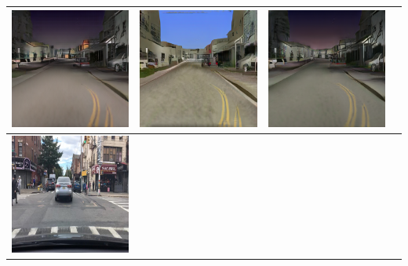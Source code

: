 \documentclass{VUMIFPSkursinis}
\begin{document}
\begin{table}[H]
{\begin{tabular}{|c|c|c|c|}
                \includegraphics[scale=0.35]{img/pvz/3_cycle_v2} & \includegraphics[scale=0.35]{img/pvz/3_cut_v2} & \includegraphics[scale=0.35]{img/pvz/3_mspc_v2}
                \\
                \hline
                \includegraphics[scale=0.35]{img/pvz/4_real} & 

\end{tabular}}
\end{table}
\end{document}
